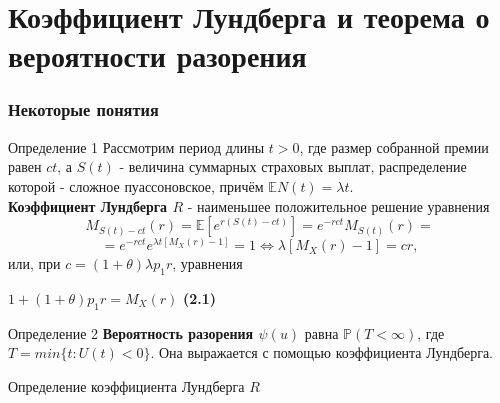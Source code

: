 \documentclass[10pt]{beamer}
\begin{document}
\section{Коэффициент Лундберга и теорема о вероятности разорения}
\begin{frame}
\frametitle{Некоторые понятия}
\begin{block}{Определение 1}
Рассмотрим период длины $t > 0$, где размер собранной  премии равен $ct$, а $S(t)$ - величина суммарных страховых выплат, распределение которой - сложное пуассоновское, причём $\mathbb{E}N(t) = {\lambda}t$.
\\ \textbf{Коэффициент Лундберга ${R}$} - наименьшее положительное решение уравнения $$M_{S(t)-ct}(r) = \mathbb{E}[e^{r(S(t)-ct)}] = e^{-rct}M_{S(t)}(r) = $$ $$= e^{-rct}e^{{\lambda}t[M_{X}(r)-1]} = 1 \Leftrightarrow {\lambda}[M_{X}(r)-1] = cr,$$или, при $c = (1+{\theta}){\lambda}p_{1}r$, уравнения 
\begin{center}$1+(1+\theta)p_{1}r = M_{X}(r)$ \textbf{(2.1)} \end{center}
\end{block}
\begin{block}{Определение 2}
\textbf{Вероятность разорения $\psi(u)$} равна $\mathbb{P}(T < \infty)$, где $T = min\{t: U(t) < 0\}$. Она выражается с помощью коэффициента Лундберга.
\end{block}
\end{frame}


\begin{frame}
\begin{center}

    Определение коэффициента Лундберга $R$
\end{center}
\end{frame}
\end{document}

